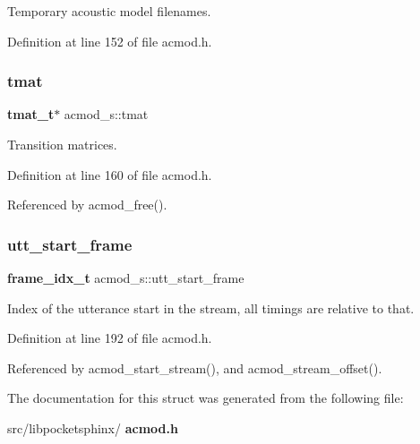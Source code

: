 Temporary acoustic model filenames. 



Definition at line 152 of file acmod.\+h.

\mbox{\label{structacmod__s_aaa3982184a49f0d61e397ba89f486259}} 
\subsubsection{tmat}
{\footnotesize\ttfamily \textbf{ tmat\+\_\+t}$\ast$ acmod\+\_\+s\+::tmat}



Transition matrices. 



Definition at line 160 of file acmod.\+h.



Referenced by acmod\+\_\+free().

\mbox{\label{structacmod__s_aecf7cf72f18a8ecb1cc8e96928bc1ad4}} 
\subsubsection{utt\+\_\+start\+\_\+frame}
{\footnotesize\ttfamily \textbf{ frame\+\_\+idx\+\_\+t} acmod\+\_\+s\+::utt\+\_\+start\+\_\+frame}



Index of the utterance start in the stream, all timings are relative to that. 



Definition at line 192 of file acmod.\+h.



Referenced by acmod\+\_\+start\+\_\+stream(), and acmod\+\_\+stream\+\_\+offset().



The documentation for this struct was generated from the following file\+:\begin{DoxyCompactItemize}
\item 
src/libpocketsphinx/\textbf{ acmod.\+h}\end{DoxyCompactItemize}
